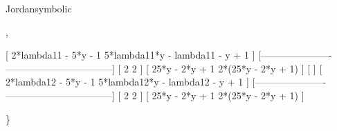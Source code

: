 \begin{Operator}{Jordansymbolic}
\begin{Examples}
\begin{multilineoutput}{6cm}
 ,


 [ 2*lambda11 - 5*y - 1    5*lambda11*y - lambda11 - y + 1 ]
 [----------------------  ---------------------------------]
 [       2                              2                  ]
 [   25*y  - 2*y + 1             2*(25*y  - 2*y + 1)       ]
 [                                                         ]
 [ 2*lambda12 - 5*y - 1    5*lambda12*y - lambda12 - y + 1 ]
 [----------------------  ---------------------------------]
 [       2                              2                  ]
 [   25*y  - 2*y + 1             2*(25*y  - 2*y + 1)       ]

 \}

\end{multilineoutput}\\
\end{Examples}
\end{Operator}



